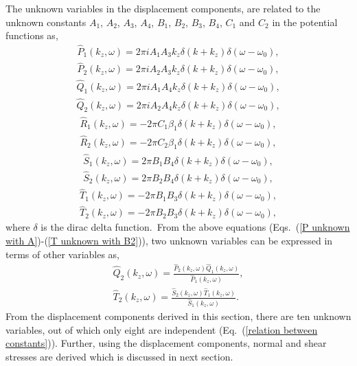 \documentclass[twocolumn,10pt]{asme2ej}
\begin{document}
The unknown variables in the displacement components, are related to the unknown constants $A_1$, $A_2$, $A_3$, $A_4$, $B_1$, $B_2$, $B_3$, $B_4$, $C_1$ and $C_2$ in the potential functions as,
\begin{align}\label{P unknown with A}
    \hat{P}_1(k_z,\omega) = 2\pi i A_1 A_3 k_z\delta(k+k_z)\delta(\omega-\omega_0),\\\hat{P}_2(k_z,\omega) = 2\pi i A_2 A_3 k_z\delta(k+k_z)\delta(\omega-\omega_0),
\end{align}
\begin{align}\label{Q unknown with A}
    \hat{Q}_1(k_z,\omega) = 2\pi i A_1 A_4 k_z\delta(k+k_z)\delta(\omega-\omega_0),\\\hat{Q}_2(k_z,\omega) = 2\pi i A_2 A_4 k_z\delta(k+k_z)\delta(\omega-\omega_0),
\end{align}
\begin{align}\label{R unknown with C}
    \hat{R}_1(k_z,\omega) = -2\pi C_1\beta_1\delta(k+k_z)\delta(\omega-\omega_0),\\\hat{R}_2(k_z,\omega) = -2\pi C_2\beta_1\delta(k+k_z)\delta(\omega-\omega_0),
\end{align}
\begin{align}\label{S unknown with B}
    \hat{S}_1(k_z,\omega) = 2\pi B_1 B_4\delta(k+k_z)\delta(\omega-\omega_0),\\ \hat{S}_2(k_z,\omega) = 2\pi B_2 B_4\delta(k+k_z)\delta(\omega-\omega_0),
\end{align}
\begin{align}\label{T unknown with B}
    \hat{T}_1(k_z,\omega) = -2\pi B_1 B_3\delta(k+k_z)\delta(\omega-\omega_0),\\ \hat{T}_2(k_z,\omega) = -2\pi B_2 B_3\delta(k+k_z)\delta(\omega-\omega_0)\label{T unknown with B2},
\end{align}
where $\delta$ is the dirac delta function.~From the above equations (Eqs.~(\ref{P unknown with A})-(\ref{T unknown with B2})), two unknown variables can be expressed in terms of other variables as,
\begin{multline}\label{relation between constants}
    \hat{Q}_2(k_z,\omega) = \frac{\hat{P}_2(k_z,\omega) \hat{Q}_1(k_z,\omega)}{\hat{P}_1(k_z,\omega)},\\ \hat{T}_2(k_z,\omega) = \frac{\hat{S}_2(k_z,\omega) \hat{T}_1(k_z,\omega)}{\hat{S}_1(k_z,\omega)}.
\end{multline}
From the displacement components derived in this section, there are ten unknown variables, out of which only eight are independent (Eq.~(\ref{relation between constants})). Further, using the displacement components, normal and shear stresses are derived which is discussed in next section. 
\end{document}

